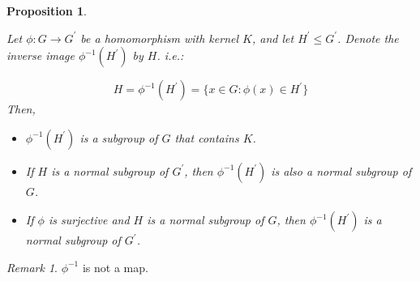 \documentclass[
]{book}
\providecommand{\tightlist}{%
  \setlength{\itemsep}{0pt}\setlength{\parskip}{0pt}}
\newtheorem{proposition}{Proposition}[chapter]
\theoremstyle{definition}
\theoremstyle{definition}
\theoremstyle{definition}
\theoremstyle{definition}
\theoremstyle{remark}
\newtheorem*{remark}{Remark}
\begin{document}
\begin{proposition}
\protect\hypertarget{prp:2104}{}\label{prp:2104}

Let \(\phi:G \to G^{\prime}\) be a homomorphism with kernel \(K\), and let \(H^\prime\leq G^\prime\). Denote the inverse image \(\phi^{-1}(H^\prime)\) by \(H\). i.e.:

\[H=\phi^{-1}(H^\prime)=\{x\in G: \phi(x)\in H^\prime\}\]
Then,

\begin{itemize}
\tightlist
\item
  \(\phi^{-1}(H^\prime)\) is a subgroup of \(G\) that contains \(K\).
\item
  If \(H\) is a normal subgroup of \(G^\prime\), then \(\phi^{-1}(H^\prime)\) is also a normal subgroup of \(G\).
\item
  If \(\phi\) is surjective and \(H\) is a normal subgroup of \(G\), then \(\phi^{-1}(H^\prime)\) is a normal subgroup of \(G^\prime\).
\end{itemize}

\end{proposition}

\begin{remark}
\(\phi^{-1}\) is not a map.
\end{remark}
\end{document}
